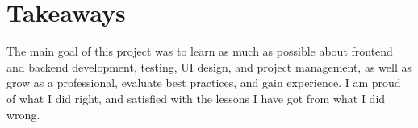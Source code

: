 \section{Takeaways}\label{sec:takeaways}

The main goal of this project
was to learn as much as possible about
frontend and backend development,
testing,
UI design, and
project management,
as well as grow as a professional,
evaluate best practices,
and gain experience.
I am proud of what I did right,
and satisfied with the lessons
I have got from what I did wrong.




